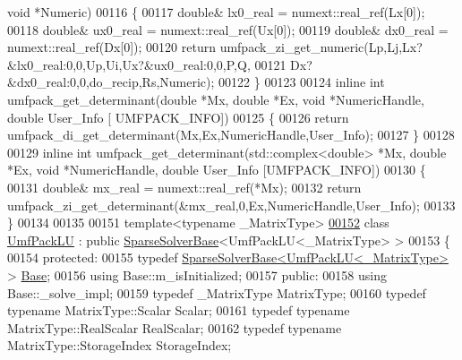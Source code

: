 \begin{DoxyCode}
{      void} *Numeric)
00116 \{
00117   \textcolor{keywordtype}{double}& lx0\_real = numext::real\_ref(Lx[0]);
00118   \textcolor{keywordtype}{double}& ux0\_real = numext::real\_ref(Ux[0]);
00119   \textcolor{keywordtype}{double}& dx0\_real = numext::real\_ref(Dx[0]);
00120   \textcolor{keywordflow}{return} umfpack\_zi\_get\_numeric(Lp,Lj,Lx?&lx0\_real:0,0,Up,Ui,Ux?&ux0\_real:0,0,P,Q,
00121                                 Dx?&dx0\_real:0,0,do\_recip,Rs,Numeric);
00122 \}
00123 
00124 \textcolor{keyword}{inline} \textcolor{keywordtype}{int} umfpack\_get\_determinant(\textcolor{keywordtype}{double} *Mx, \textcolor{keywordtype}{double} *Ex, \textcolor{keywordtype}{void} *NumericHandle, \textcolor{keywordtype}{double} User\_Info [
      UMFPACK\_INFO])
00125 \{
00126   \textcolor{keywordflow}{return} umfpack\_di\_get\_determinant(Mx,Ex,NumericHandle,User\_Info);
00127 \}
00128 
00129 \textcolor{keyword}{inline} \textcolor{keywordtype}{int} umfpack\_get\_determinant(std::complex<double> *Mx, \textcolor{keywordtype}{double} *Ex, \textcolor{keywordtype}{void} *NumericHandle, \textcolor{keywordtype}{double} 
      User\_Info [UMFPACK\_INFO])
00130 \{
00131   \textcolor{keywordtype}{double}& mx\_real = numext::real\_ref(*Mx);
00132   \textcolor{keywordflow}{return} umfpack\_zi\_get\_determinant(&mx\_real,0,Ex,NumericHandle,User\_Info);
00133 \}
00134 
00135 
00151 \textcolor{keyword}{template}<\textcolor{keyword}{typename} \_MatrixType>
\hyperlink{class_eigen_1_1_umf_pack_l_u}{00152} \textcolor{keyword}{class }\hyperlink{class_eigen_1_1_umf_pack_l_u}{UmfPackLU} : \textcolor{keyword}{public} \hyperlink{group___sparse_core___module_class_eigen_1_1_sparse_solver_base}{SparseSolverBase}<UmfPackLU<\_MatrixType> >
00153 \{
00154   \textcolor{keyword}{protected}:
00155     \textcolor{keyword}{typedef} \hyperlink{group___sparse_core___module_class_eigen_1_1_sparse_solver_base}{SparseSolverBase<UmfPackLU<\_MatrixType>} > 
      \hyperlink{group___sparse_core___module}{Base};
00156     \textcolor{keyword}{using} Base::m\_isInitialized;
00157   \textcolor{keyword}{public}:
00158     \textcolor{keyword}{using} Base::\_solve\_impl;
00159     \textcolor{keyword}{typedef} \_MatrixType MatrixType;
00160     \textcolor{keyword}{typedef} \textcolor{keyword}{typename} MatrixType::Scalar Scalar;
00161     \textcolor{keyword}{typedef} \textcolor{keyword}{typename} MatrixType::RealScalar RealScalar;
00162     \textcolor{keyword}{typedef} \textcolor{keyword}{typename} MatrixType::StorageIndex StorageIndex;

\end{DoxyCode}
